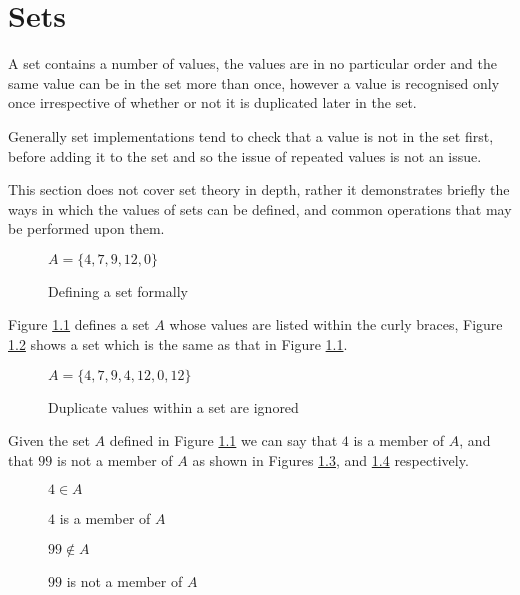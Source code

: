 \chapter{Sets}
A set contains a number of values, the values are in no particular order and the same value can be in the set more than once, however a value is recognised only once irrespective of whether or not it is duplicated later in the set.

Generally set implementations tend to check that a value is not in the set first, before adding it to the set and so the issue of repeated values is not an issue.

This section does not cover set theory in depth, rather it demonstrates briefly the ways in which the values of sets can be defined, and common operations that may be performed upon them.

\begin{figure}
\begin{center}
$A = \{4, 7, 9, 12, 0\}$
\end{center}
\caption{Defining a set formally} \label{fig:set_definition}
\end{figure}

Figure \ref{fig:set_definition} defines a set $A$ whose values are listed within the curly braces, Figure \ref{fig:set_definition_duplicates} shows a set which is the same as that in Figure \ref{fig:set_definition}. 

\begin{figure}
\begin{center}
$A = \{4, 7, 9, 4, 12, 0, 12\}$
\end{center} 
\caption{Duplicate values within a set are ignored} \label{fig:set_definition_duplicates}
\end{figure}

Given the set $A$ defined in Figure \ref{fig:set_definition} we can say that $4$ is a member of $A$, and that $99$ is not a member of $A$ as shown in Figures \ref{fig:set_member_of}, and \ref{fig:set_not_member_of} respectively.

\begin{figure}
\begin{center}
$4 \in A$
\end{center}
\caption{$4$ is a member of $A$} \label{fig:set_member_of}
\end{figure}

\begin{figure}
\begin{center}
$99 \notin A$
\end{center}
\caption{$99$ is not a member of $A$} \label{fig:set_not_member_of}
\end{figure}


